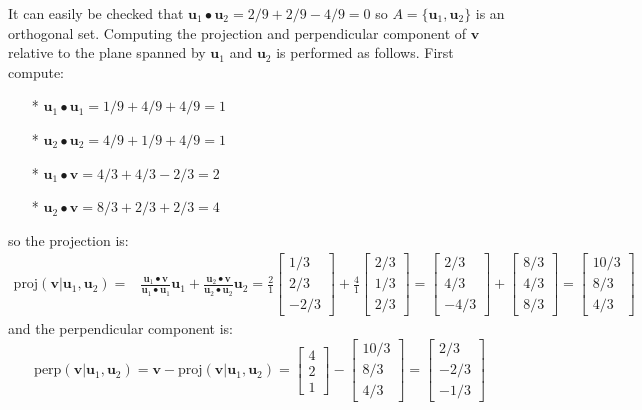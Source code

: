 \documentclass{article}
\begin{document}
\begin{itemize}
It can easily be checked that \(\mathbf{u}_1 \bullet \mathbf{u}_2 = 2/9 + 2/9 - 4/9 = 0\) so \(A = \{\mathbf{u}_1, \mathbf{u}_2\}\) is an orthogonal set. Computing the projection and perpendicular component of \(\mathbf{v}\) relative to the plane spanned by \(\mathbf{u}_1\) and \(\mathbf{u}_2\) is performed as follows. First compute:
\begin{itemize}
\item[*] \(\mathbf{u}_1 \bullet \mathbf{u}_1 = 1/9 + 4/9 + 4/9 = 1\)
\item[*] \(\mathbf{u}_2 \bullet \mathbf{u}_2 = 4/9 + 1/9 + 4/9 = 1\)
\item[*] \(\mathbf{u}_1 \bullet \mathbf{v} = 4/3 + 4/3 - 2/3 = 2\)
\item[*] \(\mathbf{u}_2 \bullet \mathbf{v} = 8/3 + 2/3 + 2/3 = 4\)
\end{itemize} 
so the projection is:
\begin{align*}
\text{proj}(\mathbf{v} | \mathbf{u}_1, \mathbf{u}_2) = & \frac{\mathbf{u}_1 \bullet \mathbf{v}}{\mathbf{u}_1 \bullet \mathbf{u}_1}\mathbf{u}_1 + \frac{\mathbf{u}_2 \bullet \mathbf{v}}{\mathbf{u}_2 \bullet \mathbf{u}_2}\mathbf{u}_2  
= \frac{2}{1}\begin{bmatrix} 1/3 \\ 2/3 \\ -2/3 \end{bmatrix} + \frac{4}{1}\begin{bmatrix} 2/3 \\ 1/3 \\ 2/3 \end{bmatrix} 
= \begin{bmatrix} 2/3 \\ 4/3 \\ -4/3 \end{bmatrix} + \begin{bmatrix} 8/3 \\ 4/3 \\ 8/3 \end{bmatrix} 
= \begin{bmatrix} 10/3 \\ 8/3 \\ 4/3 \end{bmatrix}
\end{align*}
and the perpendicular component is:
\[\text{perp}(\mathbf{v} | \mathbf{u}_1, \mathbf{u}_2) = \mathbf{v} - \text{proj}(\mathbf{v} | \mathbf{u}_1, \mathbf{u}_2) = \begin{bmatrix} 4 \\ 2 \\ 1 \end{bmatrix} - \begin{bmatrix} 10/3 \\ 8/3 \\ 4/3 \end{bmatrix} = \begin{bmatrix} 2/3 \\ -2/3 \\ -1/3 \end{bmatrix}\]

\end{itemize}
\end{document}
